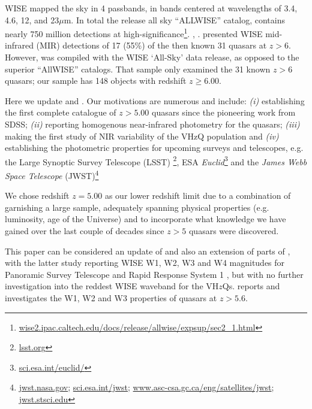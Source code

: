 \documentclass[usenatbib]{mnras}
\begin{document}
WISE mapped the sky in 4 passbands, in bands centered at wavelengths
of 3.4, 4.6, 12, and 23$\mu$m.  In total the release all sky
``ALLWISE'' catalog, contains nearly 750 million detections at
high-significance\footnote{\href{wise2.ipac.caltech.edu/docs/release/allwise/expsup/sec2\_1.html}{wise2.ipac.caltech.edu/docs/release/allwise/expsup/sec2\_1.html}}. \citet{Assef2013},
\citet{Stern2012}. \citet{Blain2013} presented WISE mid-infrared (MIR)
detections of 17 (55\%) of the then known 31 quasars at $z >
6$. However, \citet{Blain2013} was compiled with the WISE `All-Sky'
data release, as opposed to the superior ``AllWISE'' catalogs. That
sample only examined the 31 known $z>6$ quasars; our sample has 148
objects with redshift $z \geq 6.00$.

Here we update \citet{Jiang2010} and \citet{Blain2013} \citep[along
with Table 8 of][]{Banados2016}. Our motivations are numerous and
include: {\it (i)} establishing the first complete catalogue of
$z>5.00$ quasars since the pioneering work from SDSS; {\it (ii)}
reporting homogenous near-infrared photometry for the quasars; {\it
(iii)} making the first study of NIR variability of the VHzQ
population and {\it (iv)} establishing the photometric properties for
upcoming surveys and telescopes, e.g. the Large Synoptic Survey
Telescope (LSST) \footnote{\href{https://www.lsst.org}{{lsst.org}}},
ESA {\it
Euclid}\footnote{\href{https://sci.esa.int/euclid/}{sci.esa.int/euclid/}}
and the {\it James Webb Space Telescope}
(JWST)\footnote{\href{https://www.jwst.nasa.gov/}{jwst.nasa.gov};
\href{https://sci.esa.int/jwst/}{sci.esa.int/jwst};
\href{https://www.asc-csa.gc.ca/eng/satellites/jwst/}{www.asc-csa.gc.ca/eng/satellites/jwst};
\href{https://jwst.stsci.edu/}{jwst.stsci.edu}}

We chose redshift $z=5.00$ as our lower redshift limit due to a combination 
of garnishing a large sample, adequately spanning physical properties 
(e.g. luminosity, age of the Universe) and to incorporate what knowledge 
we have gained over the last couple of decades since $z>5$ quasars were 
discovered. 

This paper can be considered an update of \citet{Blain2013} and also
an extension of parts of \citet{Banados2016}, with the latter study reporting
WISE W1, W2, W3 and W4 magnitudes for Panoramic Survey Telescope and Rapid Response System 1 
\citep[Pan-STARRS1, PS1;][]{Kaiser2002, Kaiser2010}, but with no  
further investigation into the reddest WISE waveband for the VH$z$Qs.
\citet{Banados2016} reports and investigates the W1, W2 and W3 properties
of quasars at $z > 5.6$.
\end{document}
